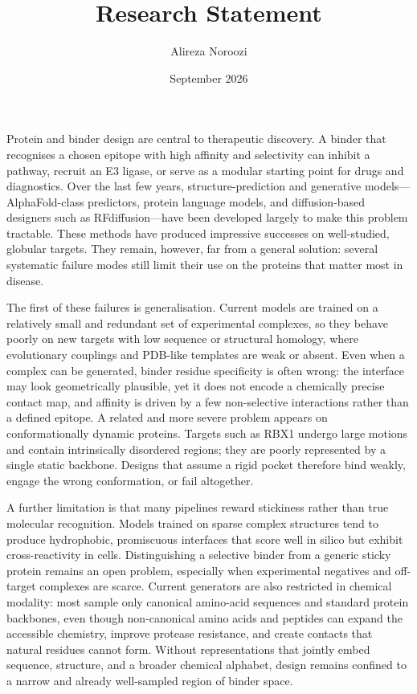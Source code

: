 \documentclass{article}
\title{Research Statement}
\author{Alireza Noroozi}
\date{September 2026}
\begin{document}
\maketitle




Protein and binder design are central to therapeutic discovery.
A binder that recognises a chosen epitope with high affinity and selectivity can inhibit a pathway,
recruit an E3 ligase, or serve as a modular starting point for drugs and diagnostics.
Over the last few years, structure-prediction and generative models---AlphaFold-class predictors, protein language models,
and diffusion-based designers such as RFdiffusion---have been developed largely to make this problem tractable.
These methods have produced impressive successes on well-studied, globular targets. 
They remain, however, far from a general solution: several systematic failure modes
still limit their use on the proteins that matter most in disease.

The first of these failures is generalisation. Current models are trained on a relatively small
and redundant set of experimental complexes, so they behave poorly on new targets with low sequence
or structural homology, where evolutionary couplings and PDB-like templates are weak or absent.
Even when a complex can be generated, binder residue specificity is often wrong: the interface may
look geometrically plausible, yet it does not encode a chemically precise contact map,
and affinity is driven by a few non-selective interactions rather than a defined epitope.
A related and more severe problem appears on conformationally dynamic proteins. Targets such as
RBX1 undergo large motions and contain intrinsically disordered regions; they are poorly represented
by a single static backbone. Designs that assume a rigid pocket therefore bind weakly,
engage the wrong conformation, or fail altogether.

A further limitation is that many pipelines reward stickiness rather than true molecular recognition.
Models trained on sparse complex structures tend to produce hydrophobic, promiscuous interfaces that
score well in silico but exhibit cross-reactivity in cells. Distinguishing a selective binder from a
generic sticky protein remains an open problem, especially when experimental negatives and off-target complexes 
are scarce. Current generators are also restricted in chemical modality: most sample only canonical amino-acid 
sequences and standard protein backbones, even though non-canonical amino acids and peptides can expand the accessible
chemistry, improve protease resistance, and create contacts that natural residues cannot form. Without representations 
that jointly embed sequence, structure, and a broader chemical alphabet, design remains confined to a narrow and already 
well-sampled region of binder space.
\end{document}
